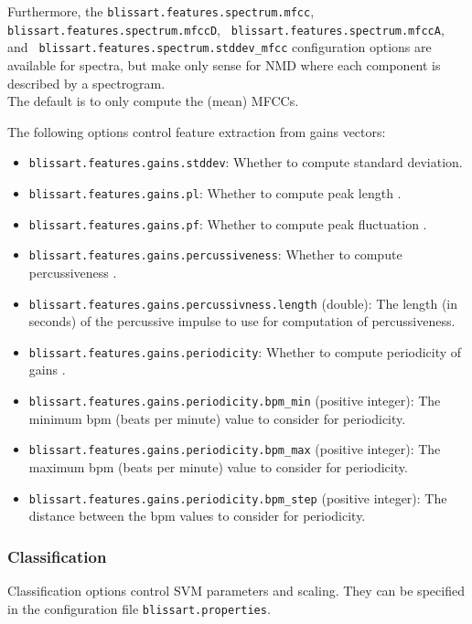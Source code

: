 Furthermore, the {\tt blissart.features.spectrum.mfcc}, {\tt
blissart.features.spectrum.mfccD}, {\tt
blissart.features.spectrum.mfccA}, and {\tt
blissart.features.spectrum.stddev\_mfcc} configuration options are available
for spectra, but make only sense for NMD where each component is
described by a spectrogram. 
\\
The default is to only compute the (mean) MFCCs.

The following options control feature extraction from gains vectors:
\begin{itemize}
  \item {\tt blissart.features.gains.stddev}: Whether to compute standard
    deviation.
  \item {\tt blissart.features.gains.pl}: Whether to compute peak length
    \cite{Virtanen2005}.
  \item {\tt blissart.features.gains.pf}: Whether to compute peak fluctuation
    \cite{Virtanen2005}.
  \item {\tt blissart.features.gains.percussiveness}: Whether to compute
    percussiveness \cite{Uhle2003}.
  \item {\tt blissart.features.gains.percussivness.length} (double): The length
    (in seconds) of the percussive impulse to use for computation of
    percussiveness.
  \item {\tt blissart.features.gains.periodicity}: Whether to compute
    periodicity of gains \cite{Virtanen2005}.
  \item {\tt blissart.features.gains.periodicity.bpm\_min} (positive integer):
    The minimum bpm (beats per minute) value to consider for periodicity.
  \item {\tt blissart.features.gains.periodicity.bpm\_max} (positive integer):
    The maximum bpm (beats per minute) value to consider for periodicity.
  \item {\tt blissart.features.gains.periodicity.bpm\_step} (positive integer):
    The distance between the bpm values to consider for periodicity.
\end{itemize}


\subsubsection{Classification}
\label{section:ConfigFileClassification}

Classification options control SVM parameters and scaling. They can be specified
in the configuration file {\tt blissart.properties}.

